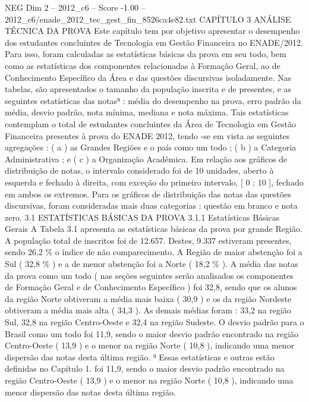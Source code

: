 \begin{textsample}{NEG Dim 2 – 2012\_c6 – Score -1.00 – 2012\_c6/enade\_2012\_tec\_gest\_fin\_8526ca4e82.txt}  \label{ex:f2_neg_186}
CAPÍTULO 3 ANÁLISE TÉCNICA DA PROVA Este capítulo tem por objetivo apresentar o desempenho dos estudantes concluintes de Tecnologia em Gestão Financeira no ENADE/2012.
Para isso, foram calculadas as estatísticas básicas da prova em seu todo, bem como as estatísticas dos componentes relacionadas à Formação Geral, ao de Conhecimento Específico da Área e das questões discursivas isoladamente.
Nas tabelas, são apresentados o tamanho da população inscrita e de presentes, e as seguintes estatísticas das notas⁹ : média do desempenho na prova, erro padrão da média, desvio padrão, nota mínima, mediana e nota máxima.
Tais estatísticas contemplam o total de estudantes concluintes da Área de Tecnologia em Gestão Financeira presentes à prova do ENADE 2012, tendo -se em vista as seguintes agregações : ( a ) as Grandes Regiões e o país como um todo ; ( b ) a Categoria Administrativa ; e ( c ) a Organização Acadêmica.
Em relação aos gráficos de distribuição de notas, o intervalo considerado foi de 10 unidades, aberto à esquerda e fechado à direita, com exceção do primeiro intervalo, [ 0 ; 10 ], fechado em ambos os extremos.
Para os gráficos de distribuição das notas das questões discursivas, foram consideradas mais duas categorias : questão em branco e nota zero. 3.1 ESTATÍSTICAS BÁSICAS DA PROVA 3.1.1 Estatísticas Básicas Gerais A Tabela 3.1 apresenta as estatísticas básicas da prova por grande Região.
A população total de inscritos foi de 12.657.
Destes, 9.337 estiveram presentes, sendo 26,2 \% o índice de não comparecimento.
A Região de maior abstenção foi a Sul ( 32,8 \% ) e a de menor abstenção foi a Norte ( 18,2 \% ).
A média das notas da prova como um todo ( nas seções seguintes serão analisados os componentes de Formação Geral e de Conhecimento Específico ) foi 32,8, sendo que os alunos da região Norte obtiveram a média mais baixa ( 30,9 ) e os da região Nordeste obtiveram a média mais alta ( 34,3 ).
As demais médias foram : 33,2 na região Sul, 32,8 na região Centro-Oeste e 32,4 na região Sudeste.
O desvio padrão para o Brasil como um todo foi 11,9, sendo o maior desvio padrão encontrado na região Centro-Oeste ( 13,9 ) e o menor na região Norte ( 10,8 ), indicando uma menor dispersão das notas desta última região. ⁹ Essas estatísticas e outras estão definidas no Capítulo 1. foi 11,9, sendo o maior desvio padrão encontrado na região Centro-Oeste ( 13,9 ) e o menor na região Norte ( 10,8 ), indicando uma menor dispersão das notas desta última região.

\end{textsample}
